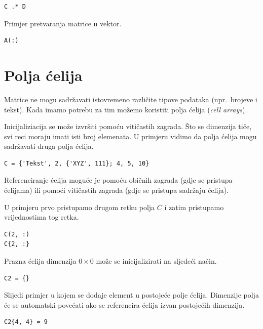 \documentclass[a4paper, 10pt]{article}
\begin{document}
\begin{lstlisting}
C .* D
\end{lstlisting}

Primjer pretvaranja matrice u vektor.

\begin{lstlisting}
A(:)
\end{lstlisting}


\section{Polja ćelija}

Matrice ne mogu sadržavati istovremeno različite tipove podataka (npr.\ brojeve i tekst).
Kada imamo potrebu za tim možemo koristiti polja ćelija (\emph{cell arrays}).

Inicijaliziacija se može izvršiti pomoću vitičastih zagrada.
Što se dimenzija tiče, svi reci moraju imati isti broj elemenata.
U primjeru vidimo da polja ćelija mogu sadržavati druga polja ćelija.

\begin{lstlisting}
C = {'Tekst', 2, {'XYZ', 111}; 4, 5, 10}
\end{lstlisting}

Referenciranje ćelija moguće je pomoću običnih zagrada (gdje se pristupa ćelijama) ili pomoći vitičastih zagrada (gdje se pristupa sadržaju ćelija).

U primjeru prvo pristupamo drugom retku polja $C$ i zatim pristupamo vrijednostima tog retka.

\begin{lstlisting}
C(2, :)
C{2, :}
\end{lstlisting}

Prazna ćelija dimenzija $0 \times 0$ može se inicijalizirati na sljedeći način.

\begin{lstlisting}
C2 = {}
\end{lstlisting}

Slijedi primjer u kojem se dodaje element u postojeće polje ćelija.
Dimenzije polja će se automatski povećati ako se referencira ćelija izvan postojećih dimenzija.

\begin{lstlisting}
C2{4, 4} = 9
\end{lstlisting}
\end{document}
